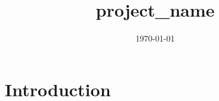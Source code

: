 \documentclass[11pt]{article}
\title{ {{project_name}} }
\author{}
\date{\today}
\begin{document}
\maketitle

\section{Introduction}
\end{document}
